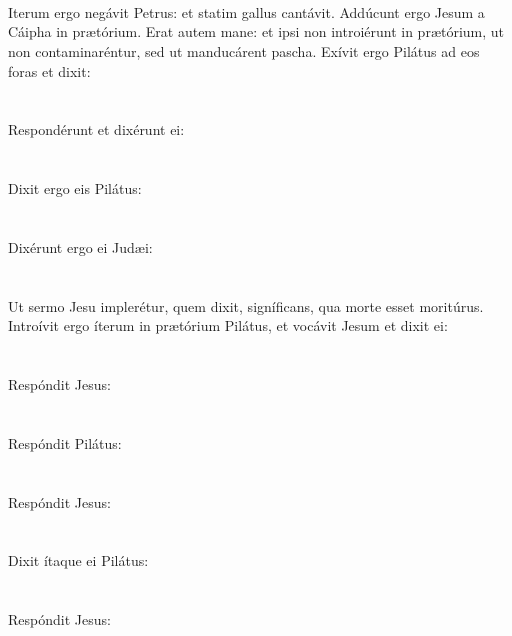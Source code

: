 \documentclass[12pt, a4paper]{article}
\begin{document}
	\\\\
	\\
	Iterum ergo negávit Petrus: et statim gallus cantávit. Addúcunt ergo Jesum a Cáipha in prætórium. Erat autem mane: et ipsi non introiérunt in prætórium, ut non contaminaréntur, sed ut manducárent pascha. Exívit ergo Pilátus ad eos foras et dixit: 
	\\\\
	\\
	Respondérunt et dixérunt ei:
	\\\\
	\\
	Dixit ergo eis Pilátus: 
	\\\\
	\\
	Dixérunt ergo ei Judæi:
	\\\\
	\\
	Ut sermo Jesu implerétur, quem dixit, signíficans, qua morte esset moritúrus. Introívit ergo íterum in prætórium Pilátus, et vocávit Jesum et dixit ei:
	\\\\
	\\
	Respóndit Jesus:
	\\\\
	\\
	Respóndit Pilátus:
	\\\\
	\\
	Respóndit Jesus:
	\\\\
	\\
	Dixit ítaque ei Pilátus:
	\\\\
	\\
	Respóndit Jesus:
	\\\\
\end{document}
